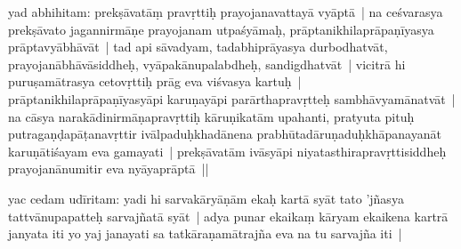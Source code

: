\documentclass[article,12pt,a4paper]{memoir}%
\newcounter{parCount}
\begin{document}
	  
	  \pstart \leavevmode%
	\label{thakur75-35.22}yad abhihitam: \label{nk_3522_start}prekṣāvatāṃ pravṛttiḥ prayojanavattayā vyāptā | na ceśvarasya prekṣāvato jagannirmāṇe prayojanam utpaśyāmaḥ, prāptanikhilaprāpaṇīyasya prāptavyābhāvāt |\label{nk_3522_end} tad api sāvadyam, tadabhiprāyasya durbodhatvāt, prayojanābhāvāsiddheḥ, vyāpakānupalabdheḥ, sandigdhatvāt | vicitrā hi puruṣamātrasya cetovṛttiḥ prāg eva viśvasya kartuḥ | prāptanikhilaprāpaṇīyasyāpi karuṇayāpi parārtha\label{ratnakīrtinibandhāvali__36r1PF7IMWRV4JZSWYNB05SZCTW}pravṛtteḥ\label{ratnakīrtinibandhāvali__36r1PF7IMWR7I4SV0JG3GBCU654} sambhāvyamānatvāt | na cāsya narakādinirmāṇapravṛttiḥ kāruṇikatām upahanti, pratyuta pituḥ putragaṇḍapāṭanavṛttir ivālpaduḥkhadānena prabhūtadāruṇaduḥkhāpanayanāt karuṇātiśayam eva gamayati | prekṣāvatām ivāsyāpi niyatasthirapravṛttisiddheḥ prayojanānumitir eva nyāyaprāptā ||
	{}
	\pend%
      

	  
	  \pstart \leavevmode%
	\label{thakur75-35.31}yac cedam udīritam: yadi hi sarvakāryāṇām ekaḥ kartā syāt tato 'jñasya tattvānupapatteḥ sarvajñatā syāt | \label{ratnakīrtinibandhāvali__36r1PF7IMWQKR7W5N7YIKB3F4T2}adya\label{ratnakīrtinibandhāvali__36r1PF7IMWPXIAKW6HP32AFTWQM} punar ekaikaṃ kāryam ekaikena kartrā \leavevmode{}\label{RNAms_20b} janyata iti yo yaj janayati sa tatkāraṇamātrajña eva na tu sarvajña iti |
	{}
	\pend%
      
\end{document}
